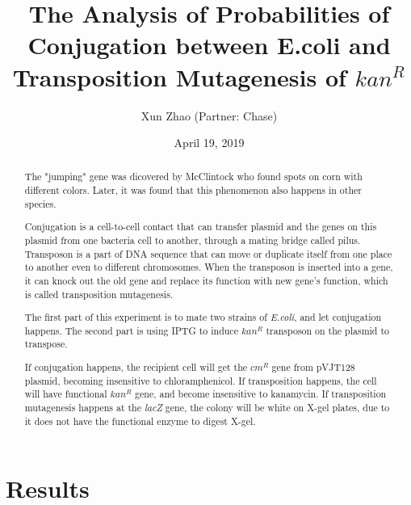 \documentclass{article}
\title{\bf{The Analysis of Probabilities of Conjugation between E.coli and Transposition Mutagenesis of }$kan^R$}
\author{Xun Zhao (Partner: Chase)}
\date{April 19, 2019}
\begin{document}
    \begin{titlepage}
        \maketitle
        \setcounter{page}{0}
        \thispagestyle{empty}
    \end{titlepage}

    \renewcommand{\abstractname}{Introduction}
    \begin{abstract}
		The "jumping" gene was dicovered by McClintock who found spots on corn with different colors. Later, it was found that this phenomenon also happens in other species. 
		
		Conjugation is a cell-to-cell contact that can transfer plasmid and the genes on this plasmid from one bacteria cell to another, through a mating bridge called pilus. Transposon is a part of DNA sequence that can move or duplicate itself from one place to another even to different chromosomes. When the transposon is inserted into a gene, it can knock out the old gene and replace its function with new gene's function, which is called transposition mutagenesis.

		The first part of this experiment is to mate two strains of \emph{E.coli}, and let conjugation happens. The second part is using IPTG to induce $kan^R$ transposon on the plasmid to transpose.

		If conjugation happens, the recipient cell will get the $cm^R$ gene from pVJT128 plasmid, becoming insensitive to chloramphenicol. If transposition happens, the cell will have functional $kan^R$ gene, and become insensitive to kanamycin. If transposition mutagenesis happens at the \emph{lacZ} gene, the colony will be white on X-gel plates, due to it does not have the functional enzyme to digest X-gel.
	\end{abstract}

	\section{Results}
\end{document}
